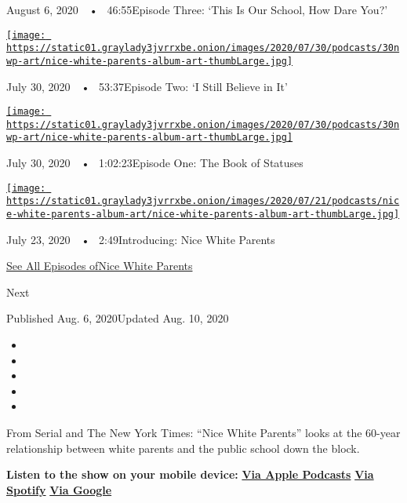 August 6, 2020~~•~ 46:55Episode Three: `This Is Our School, How Dare
You?'

\href{https://www.nytimes3xbfgragh.onion/2020/07/30/podcasts/nice-white-parents-serial-2.html?action=click\&module=audio-series-bar\&region=header\&pgtype=Article}{\texttt{[image: https://static01.graylady3jvrrxbe.onion/images/2020/07/30/podcasts/30nwp-art/nice-white-parents-album-art-thumbLarge.jpg]}}

July 30, 2020~~•~ 53:37Episode Two: `I Still Believe in It'

\href{https://www.nytimes3xbfgragh.onion/2020/07/30/podcasts/nice-white-parents-serial.html?action=click\&module=audio-series-bar\&region=header\&pgtype=Article}{\texttt{[image: https://static01.graylady3jvrrxbe.onion/images/2020/07/30/podcasts/30nwp-art/nice-white-parents-album-art-thumbLarge.jpg]}}

July 30, 2020~~•~ 1:02:23Episode One: The Book of Statuses

\href{https://www.nytimes3xbfgragh.onion/2020/07/23/podcasts/nice-white-parents-serial.html?action=click\&module=audio-series-bar\&region=header\&pgtype=Article}{\texttt{[image: https://static01.graylady3jvrrxbe.onion/images/2020/07/21/podcasts/nice-white-parents-album-art/nice-white-parents-album-art-thumbLarge.jpg]}}

July 23, 2020~~•~ 2:49Introducing: Nice White Parents

\href{https://www.nytimes3xbfgragh.onion/column/nice-white-parents}{See
All Episodes ofNice White Parents}

Next

Published Aug. 6, 2020Updated Aug. 10, 2020

\begin{itemize}
\item
\item
\item
\item
\item
\end{itemize}

From Serial and The New York Times: ``Nice White Parents'' looks at the
60-year relationship between white parents and the public school down
the block.

\textbf{Listen to the show on your mobile device:}
\textbf{\href{https://podcasts.apple.com/us/podcast/nice-white-parents/id1524080195}{Via
Apple Podcasts}} \textbf{\textbar{}}
\textbf{\href{https://open.spotify.com/show/7oBSLCZFCgpdCaBjIG8mLV?si=YcEPLD3xT2ejXmpQz-tRpw}{Via
Spotify}} \textbf{\textbar{}}
\textbf{\href{https://podcasts.google.com/feed/aHR0cHM6Ly9yc3MuYXJ0MTkuY29tL25pY2Utd2hpdGUtcGFyZW50cw}{Via
Google}}

